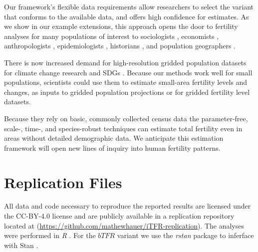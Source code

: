 \documentclass[12pt]{article}
\begin{document}
Our framework's flexible data requirements allow researchers to select
the variant that conforms to the available data, and offers high
confidence for estimates. As we show in our example extensions, this
approach opens the door to fertility analyses for many populations of
interest to sociologists \citep{lesthaeghe14}, economists
\citep{hotz1997economics}, anthropologists
\citep{greenhalgh1995situating}, epidemiologists
\citep{paulson2002pregnancy}, historians \citep{woods2000demography},
and population geographers \citep{sorichetta2015high}.

There is now increased demand for high-resolution gridded population
datasets for climate change research and SDGs
\citep{jones15, cincotta00, golding2017mapping}. Because our methods
work well for small populations, scientists could use them to estimate
small-area fertility levels and changes, as inputs to gridded population
projections or for gridded fertility level datasets.

Because they rely on basic, commonly collected census data the
parameter-free, scale-, time-, and species-robust techniques can
estimate total fertility even in areas without detailed demographic
data. We anticipate this estimation framework will open new lines of
inquiry into human fertility patterns.

\hypertarget{replication-files}{%
\section{Replication Files}\label{replication-files}}

All data and code necessary to reproduce the reported results are
licensed under the CC-BY-4.0 license and are publicly available in a
replication repository located at
(\url{https://github.com/mathewhauer/iTFR-replication}). The analyses
were performed in \emph{R} \citep{rcite}. For the \(bTFR\) variant we
use the \emph{rstan} package \citep{rstanpackage} to inferface with Stan
\citep{stanjss2017}.



\end{document}

